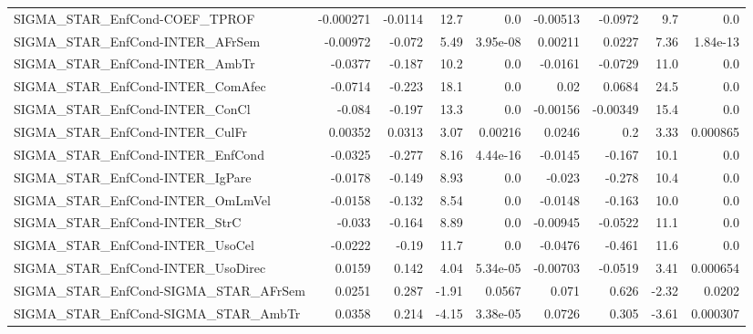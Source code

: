 \begin{tabular}{lrrrrrrrr}
SIGMA\_STAR\_EnfCond-COEF\_TPROF          &   -0.000271 &      -0.0114 &     12.7 &      0.0 &   -0.00513 &     -0.0972 &          9.7 &           0.0 \\
SIGMA\_STAR\_EnfCond-INTER\_AFrSem        &    -0.00972 &       -0.072 &     5.49 & 3.95e-08 &    0.00211 &      0.0227 &         7.36 &      1.84e-13 \\
SIGMA\_STAR\_EnfCond-INTER\_AmbTr         &     -0.0377 &       -0.187 &     10.2 &      0.0 &    -0.0161 &     -0.0729 &         11.0 &           0.0 \\
SIGMA\_STAR\_EnfCond-INTER\_ComAfec       &     -0.0714 &       -0.223 &     18.1 &      0.0 &       0.02 &      0.0684 &         24.5 &           0.0 \\
SIGMA\_STAR\_EnfCond-INTER\_ConCl         &      -0.084 &       -0.197 &     13.3 &      0.0 &   -0.00156 &    -0.00349 &         15.4 &           0.0 \\
SIGMA\_STAR\_EnfCond-INTER\_CulFr         &     0.00352 &       0.0313 &     3.07 &  0.00216 &     0.0246 &         0.2 &         3.33 &      0.000865 \\
SIGMA\_STAR\_EnfCond-INTER\_EnfCond       &     -0.0325 &       -0.277 &     8.16 & 4.44e-16 &    -0.0145 &      -0.167 &         10.1 &           0.0 \\
SIGMA\_STAR\_EnfCond-INTER\_IgPare        &     -0.0178 &       -0.149 &     8.93 &      0.0 &     -0.023 &      -0.278 &         10.4 &           0.0 \\
SIGMA\_STAR\_EnfCond-INTER\_OmLmVel       &     -0.0158 &       -0.132 &     8.54 &      0.0 &    -0.0148 &      -0.163 &         10.0 &           0.0 \\
SIGMA\_STAR\_EnfCond-INTER\_StrC          &      -0.033 &       -0.164 &     8.89 &      0.0 &   -0.00945 &     -0.0522 &         11.1 &           0.0 \\
SIGMA\_STAR\_EnfCond-INTER\_UsoCel        &     -0.0222 &        -0.19 &     11.7 &      0.0 &    -0.0476 &      -0.461 &         11.6 &           0.0 \\
SIGMA\_STAR\_EnfCond-INTER\_UsoDirec      &      0.0159 &        0.142 &     4.04 & 5.34e-05 &   -0.00703 &     -0.0519 &         3.41 &      0.000654 \\
SIGMA\_STAR\_EnfCond-SIGMA\_STAR\_AFrSem   &      0.0251 &        0.287 &    -1.91 &   0.0567 &      0.071 &       0.626 &        -2.32 &        0.0202 \\
SIGMA\_STAR\_EnfCond-SIGMA\_STAR\_AmbTr    &      0.0358 &        0.214 &    -4.15 & 3.38e-05 &     0.0726 &       0.305 &        -3.61 &      0.000307 \\

\end{tabular}
